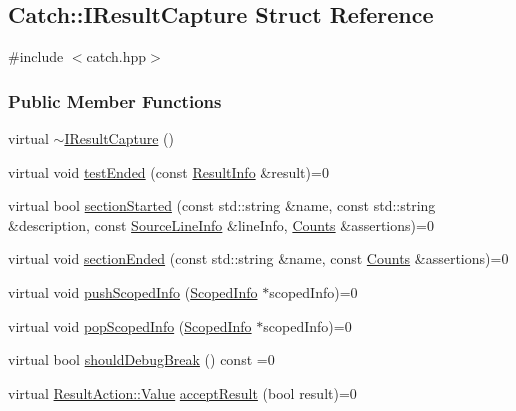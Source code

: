 \hypertarget{structCatch_1_1IResultCapture}{\subsection{Catch\-:\-:I\-Result\-Capture Struct Reference}
\label{structCatch_1_1IResultCapture}
}


{\ttfamily \#include $<$catch.\-hpp$>$}

\subsubsection*{Public Member Functions}
\begin{DoxyCompactItemize}
\item 
virtual \hyperlink{structCatch_1_1IResultCapture_a3bd16719d6772b7470887fc36c6d0808}{$\sim$\-I\-Result\-Capture} ()
\item 
virtual void \hyperlink{structCatch_1_1IResultCapture_a3a17532fc7d18e78b83f3d31e93b9217}{test\-Ended} (const \hyperlink{classCatch_1_1ResultInfo}{Result\-Info} \&result)=0
\item 
virtual bool \hyperlink{structCatch_1_1IResultCapture_af6334f4c1aa674d22c7f1054a82dbf16}{section\-Started} (const std\-::string \&name, const std\-::string \&description, const \hyperlink{structCatch_1_1SourceLineInfo}{Source\-Line\-Info} \&line\-Info, \hyperlink{structCatch_1_1Counts}{Counts} \&assertions)=0
\item 
virtual void \hyperlink{structCatch_1_1IResultCapture_add91031c212d37bcc5aadf9bdccb9319}{section\-Ended} (const std\-::string \&name, const \hyperlink{structCatch_1_1Counts}{Counts} \&assertions)=0
\item 
virtual void \hyperlink{structCatch_1_1IResultCapture_a372979aab5e851cfafceff905d6493a7}{push\-Scoped\-Info} (\hyperlink{classCatch_1_1ScopedInfo}{Scoped\-Info} $\ast$scoped\-Info)=0
\item 
virtual void \hyperlink{structCatch_1_1IResultCapture_a8d6fd1ef854284b77c35a44b3e1b5929}{pop\-Scoped\-Info} (\hyperlink{classCatch_1_1ScopedInfo}{Scoped\-Info} $\ast$scoped\-Info)=0
\item 
virtual bool \hyperlink{structCatch_1_1IResultCapture_a7839e422ccd55f298cd64f0bf4a5938b}{should\-Debug\-Break} () const =0
\item 
virtual \hyperlink{structCatch_1_1ResultAction_a42d1644a0fbcedc17959b656ce68f88d}{Result\-Action\-::\-Value} \hyperlink{structCatch_1_1IResultCapture_a9701dc69864613d6982239f2ddc358c5}{accept\-Result} (bool result)=0

\end{DoxyCompactItemize}
